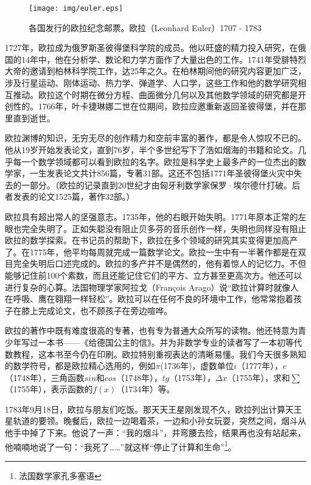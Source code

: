 \documentclass{article}
\begin{document}
\begin{figure}[htbp]
 \centering
 \texttt{[image: img/euler.eps]}
 \captionsetup{labelformat=empty}
 \caption{各国发行的欧拉纪念邮票。欧拉（Leonhard Euler）1707 - 1783}
 \label{fig:Arithmetica}
\end{figure}

1727年，欧拉成为俄罗斯圣彼得堡科学院的成员。他以旺盛的精力投入研究，在俄国的14年中，他在分析学、数论和力学方面作了大量出色的工作。1741年受腓特烈大帝的邀请到柏林科学院工作，达25年之久。在柏林期间他的研究内容更加广泛，涉及行星运动、刚体运动、热力学、弹道学、人口学，这些工作和他的数学研究相互推动。欧拉这个时期在微分方程、曲面微分几何以及其他数学领域的研究都是开创性的。1766年，叶卡捷琳娜二世在位期间，欧拉应邀重新返回圣彼得堡，并在那里直到逝世。

欧拉渊博的知识，无穷无尽的创作精力和空前丰富的著作，都是令人惊叹不已的。他从19岁开始发表论文，直到76岁，半个多世纪写下了浩如烟海的书籍和论文。几乎每一个数学领域都可以看到欧拉的名字。欧拉是科学史上最多产的一位杰出的数学家，一生发表论文共计856篇，专著31部。这还不包括1771年圣彼得堡火灾中失去的一部分。（欧拉的记录直到20世纪才由匈牙利数学家保罗·埃尔德什打破。后者发表的论文1525篇，著作32部。\cite{Wiki-Euler}）

欧拉具有超出常人的坚强意志。1735年，他的右眼开始失明。1771年原本正常的左眼也完全失明了。正如失聪没有阻止贝多芬的音乐创作一样，失明也同样没有阻止欧拉的数学探索\cite{HanXueTao2009}。在书记员的帮助下，欧拉在多个领域的研究其实变得更加高产了。在1775年，他平均每周就完成一篇数学论文。欧拉一生中有一半著作都是在双目完全失明后口述完成的。欧拉的多产并不是偶然的，他有着惊人的记忆力。不但能够记住前100个素数，而且还能记住它们的平方、立方甚至更高次方。他还可以进行复杂的心算。法国物理学家阿拉戈（François Arago）说“欧拉计算时就像人在呼吸、鹰在翱翔一样轻松”。欧拉可以在任何不良的环境中工作，他常常抱着孩子在膝上完成论文，也不顾孩子在旁边喧哗。

欧拉的著作中既有难度很高的专著，也有专为普通大众所写的读物。他还特意为青少年写过一本书——《给德国公主的信》。并为非数学专业的读者写了一本初等代数教程，这本书至今仍在印刷。欧拉特别重视表达的清晰易懂。我们今天很多熟知的数学符号，都是欧拉精心选用的，例如$\pi$(1736年)，虚数单位$i$（1777年），$e$（1748年），三角函数$sin$和$cos$（1748年），$tg$（1753年），$\Delta x$（1755年），求和$\sum$（1755年），表示函数的$f(x)$（1734年）等\cite{HanXueTao2009}。

1783年9月18日，欧拉与朋友们吃饭。那天天王星刚发现不久，欧拉列出计算天王星轨道的要领。晚餐后，欧拉一边喝着茶，一边和小孙女玩耍，突然之间，烟斗从他手中掉了下来。他说了一声：“我的烟斗”，并弯腰去捡，结果再也没有站起来，他喃喃地说了一句：“我死了……”就这样“停止了计算和生命”\footnote{法国数学家孔多塞语}。
\end{document}
